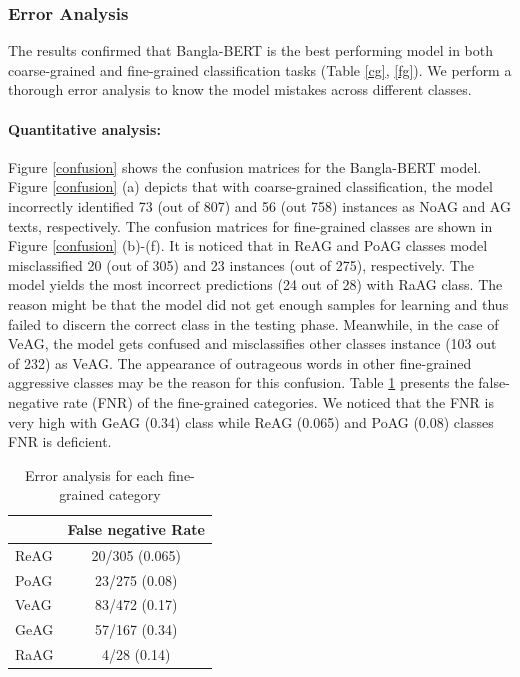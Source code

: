 \documentclass[11pt]{article}
\begin{document}
\subsubsection{Error Analysis}
The results confirmed that Bangla-BERT is the best performing model in both coarse-grained and fine-grained classification tasks (Table \ref{cg}, \ref{fg}). We perform a thorough error analysis to know the model mistakes across different classes.

\paragraph{Quantitative analysis:} Figure \ref{confusion} shows the confusion matrices for the Bangla-BERT model. Figure \ref{confusion} (a) depicts that with coarse-grained classification, the model incorrectly identified 73 (out of 807) and 56 (out 758) instances as NoAG and AG texts, respectively. The confusion matrices for fine-grained classes are shown in Figure \ref{confusion} (b)-(f). It is noticed that in ReAG and PoAG classes model misclassified 20 (out of 305) and 23 instances (out of 275), respectively. The model yields the most incorrect predictions (24 out of 28) with RaAG class. The reason might be that the model did not get enough samples for learning and thus failed to discern the correct class in the testing phase. Meanwhile, in the case of VeAG, the model gets confused and misclassifies other classes instance (103 out of 232) as VeAG. The appearance of outrageous words in other fine-grained aggressive classes may be the reason for this confusion. Table \ref{ea} presents the false-negative rate (FNR) of the fine-grained categories. We noticed that the FNR is very high with GeAG (0.34) class while ReAG (0.065) and PoAG (0.08) classes FNR is deficient.
     

\begin{table}[h!]

\begin{center}
\begin{tabular}{lc}
\hline
 \textbf{}  & \textbf{False negative Rate} \\
 \hline 
 ReAG  & 20/305 (0.065)  \\
 PoAG & 23/275 (0.08) \\
 VeAG & 83/472 (0.17) \\
 GeAG & 57/167 (0.34) \\
 RaAG & 4/28 (0.14) \\
 \hline
\end{tabular}
\caption{Error analysis for each fine-grained category}
\label{ea}
\end{center}
\end{table}
\end{document}
